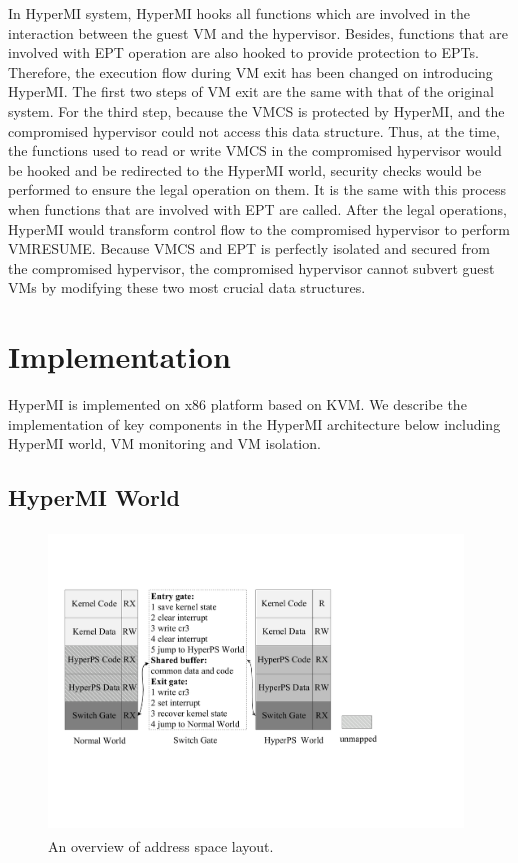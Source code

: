 \documentclass[conference]{IEEEtran}
\begin{document}
In HyperMI system, HyperMI hooks all functions which are involved in the interaction between the guest VM and the hypervisor. Besides, functions that are involved with EPT operation are also hooked to provide protection to EPTs. Therefore, the execution flow during VM exit has been changed on introducing HyperMI. The first two steps of VM exit are the same with that of the original system. For the third step, because the VMCS is protected by HyperMI, and the compromised hypervisor could not access this data structure. Thus, at the time, the functions used to read or write VMCS in the compromised hypervisor would be hooked and be redirected to the HyperMI world, security checks would be performed to ensure the legal operation on them. It is the same with this process when functions that are involved with EPT are called. 
After the legal operations, HyperMI would transform control flow to the compromised hypervisor to perform VMRESUME. Because VMCS and EPT is perfectly isolated and secured from the compromised hypervisor, the compromised hypervisor cannot subvert guest VMs by modifying these two most crucial data structures.


\section{Implementation}\label{sec:imp}

HyperMI is implemented on x86 platform based on KVM.
We describe the implementation of key components in the HyperMI architecture below including HyperMI world, VM monitoring and VM isolation.

\subsection{HyperMI World} \label {HWorld}

\begin{figure}
\centerline{\includegraphics[width=11cm, height=8cm]{pdfvmcs2.pdf}}%
\caption{An overview of address space layout.} \label{fig2}
\end{figure}
\end{document}
